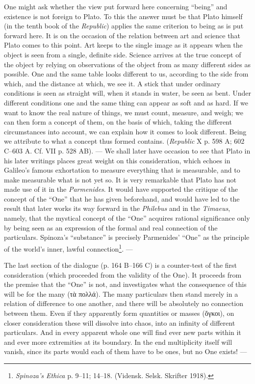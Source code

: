 \documentclass[12pt,a4paper,openany]{book}
\newcommand{\opage}[1]{\marginnote{\footnotesize\textit{[#1]}}}
\begin{document}
One might ask whether the view put forward here concerning ``being''
and existence is not foreign to Plato.  To this the answer must be that Plato himself (in
the tenth book of the \textit{Republic}) applies the same criterion
to being as is put forward here.  It is on the occasion
of the relation between art and science that Plato comes
to this point.  Art keeps to the single
image as it appears when the object is seen from
a single, definite side.  Science arrives at the true
concept of the object by relying on observations of
the object from as many different sides as possible.
One and the same table looks different to us, according to
the side from which, and the distance at which, we see it.
A stick that under ordinary conditions is seen as straight will,
when it stands in water, be seen as bent.  Under different
conditions one and the same thing can appear as soft and as
hard.  If we want to know the real nature of things,
we must count, measure, and weigh; we can then form a concept
of them, on the basis of which, taking the
different circumstances into account, we can explain how it
\setcounter{footnote}{0}%
\opage{36}comes to look different.  Being we attribute to what
a concept thus formed contains.  (\textit{Republic} X p. 598 A;
602 C--603 A.  Cf. VII p. 528 AB).  --- We shall later have occasion
to see that Plato in his later writings places great
weight on this consideration, which echoes in Galileo's
famous exhortation to measure everything that is measurable, and
to make measurable what is not yet so.  It is very
remarkable that Plato has not made use of it in the \textit{Parmenides}.
It would have supported the critique of the concept of
the ``One'' that he has given beforehand, and would have led to the
result that later works its way forward in the \textit{Philebus} and in the
\textit{Timaeus}, namely, that the mystical concept of the ``One''
acquires rational significance only by being seen as an expression of
the formal and real connection of the particulars.  Spinoza's ``substance''
is precisely Parmenides' ``One'' as the principle of the world's
inner, lawful connection\footnote[1]{\textit{Spinoza's Ethica} p. 9--11; 14--18. (Vidensk. Selsk. Skrifter 1918).}. ---

The last section of the dialogue (p. 164 B--166 C) is a counter-test
of the first consideration (which proceeded from the validity of the One).  It proceeds from the premise that the ``One'' is not, and
investigates what the consequence of this will be for the many
(τὰ πολλά).  The many particulars then stand merely in a relation of difference
to one another, and there will be absolutely no connection
between them.  Even if they apparently form
quantities or masses (ὄγκοι), on closer consideration these will
dissolve into chaos, into an infinity of different
particulars.  And in every apparent whole one will find
ever new parts within it and ever more extremities at
its boundary.  In the end multiplicity itself will vanish,
since its parts would each of them have to be ones, but no
One exists! ---
\end{document}
